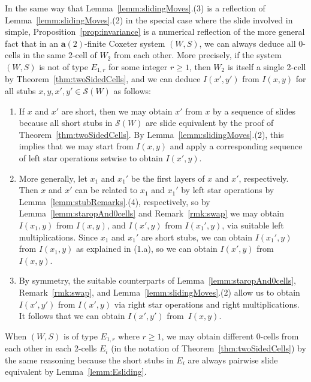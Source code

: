 \documentclass[ALCO,Unicode,published]{cedram}
\newcommand{\la}{\mathbf{a}}
\newcommand{\sw}{\mathcal{S}(W)}
\begin{document}
\begin{remark}
    \label{rmk:relating0cells}
In the same way that  Lemma~\ref{lemm:slidingMoves}.(3) is a reflection of Lemma~\ref{lemm:slidingMoves}.(2)
in the special case where the slide involved in simple, Proposition~\ref{prop:invariance} is a numerical
reflection of the more general fact that in an $\la(2)$-finite Coxeter system $(W,S)$, we can always
deduce all 0-cells in the same 2-cell of $W_2$ from each other. More precisely, if the system
$(W,S)$ is not of type $E_{1,r}$ for some integer $r\ge 1$, then $W_2$ is itself a single 2-cell by
Theorem~\ref{thm:twoSidedCells}, and we can deduce $I(x',y')$ from $I(x,y)$ for all stubs $x,y,x',y'\in
\sw$ as follows: \begin{enumerate}[leftmargin=2.5em]
    \item[(1.a)] If $x$ and $x'$ are short, then we may obtain $x'$ from $x$ by a sequence of slides
         because all short stubs in $\sw$ are slide equivalent by the proof of
         Theorem~\ref{thm:twoSidedCells}. By Lemma~\ref{lemm:slidingMoves}.(2), this implies that we may start
         from $I(x,y)$ and apply a corresponding sequence of left star operations setwise to obtain
         $I(x',y)$. 
     \item[(1.b)] More generally, let $x_1$ and $x_1'$ be the first layers of $x$ and $x'$,
          respectively. Then $x$ and $x'$ can be related to $x_1$ and $x_1'$ by left star operations
          by Lemma~\ref{lemm:stubRemarks}.(4), respectively, so by Lemma~\ref{lemm:staropAnd0cells} and
          Remark~\ref{rmk:swap} we may obtain $I(x_1,y)$ from $I(x,y)$, and $I(x',y)$ from $I(x_1',y)$,
          via suitable left multiplications. Since $x_1$ and $x_1'$ are short stubs, we can obtain
          $I(x_1',y)$ from $I(x_1,y)$ as explained in (1.a), so we can obtain $I(x',y)$ from
          $I(x,y)$.
     \item[(2)] By symmetry, the suitable counterparts of Lemma~\ref{lemm:staropAnd0cells},
          Remark~\ref{rmk:swap}, and Lemma~\ref{lemm:slidingMoves}.(2) allow us to obtain $I(x',y')$ from
          $I(x',y)$ via right star operations and right multiplications. It follows that we can
          obtain $I(x',y')$ from~$I(x,y)$.
 \end{enumerate} When $(W,S)$ is of type $E_{1,r}$ where $r\ge 1$, we may obtain different 0-cells
     from each other in each 2-cells $E_i$ (in the notation of Theorem~\ref{thm:twoSidedCells}) by the same
     reasoning because the short stubs in $E_i$ are always pairwise slide equivalent by
     Lemma~\ref{lemm:Esliding}.
 \end{remark}
\end{document}

